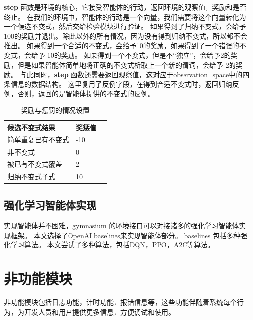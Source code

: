 \textbf{step} 函数是环境的核心，它接受智能体的行动，返回环境的观察值，奖励和是否终止。
在我们的环境中，智能体的行动是一个向量，我们需要将这个向量转化为一个候选不变式，然后交给检验模块进行验证。
如果得到了归纳不变式，会给予100的奖励并退出。除此以外的所有情况，因为没有得到归纳不变式，所以都不会推出。
如果得到一个合适的不变式，会给予10的奖励，如果得到了一个错误的不变式，会给予-10的奖励。
如果得到一个不变式，但是不“独立”，会给予2的奖励，但是如果智能体简单地将正确的不变式析取上一个新的谓词，会给予-2的奖励。
与此同时，\textbf{step} 函数还需要返回观察值，这对应于observation\_space中的四条信息的数据结构。
这里复用了反例字段，在得到合适不变式时，返回归纳反例，否则，返回的是智能体提供的不变式的反例。
\begin{table}[!h]
    \label{table:award_punish}
	\centering
	\caption{奖励与惩罚的情况设置}
	\label{tab::situation}
	\renewcommand\arraystretch{1.4}
	\begin{tabular}{p{}p{}p{}}
		\toprule
		\textbf{候选不变式结果}   & \textbf{奖惩值} \\ 
        \midrule
		简单重复已有不变式 & -10 \\
		非不变式      & 0   \\
		被已有不变式覆盖  & 2   \\
		归纳不变式子式   & 10 \\
        \bottomrule
	\end{tabular}
\end{table}

\subsection{强化学习智能体实现}

实现智能体并不困难，gymnasium 的环境接口可以对接诸多的强化学习智能体实现框架。
本文选择了OpenAI \href{https://github.com/openai/baselines}{baselines}\cite{baselines}来实现智能体部分。
baselines 包括多种强化学习算法。
本文尝试了多种算法，包括DQN，PPO，A2C等算法。

\section{非功能模块}

非功能模块包括日志功能，计时功能，报错信息等，这些功能伴随着系统每个行为，为开发人员和用户提供更多信息，方便调试和使用。